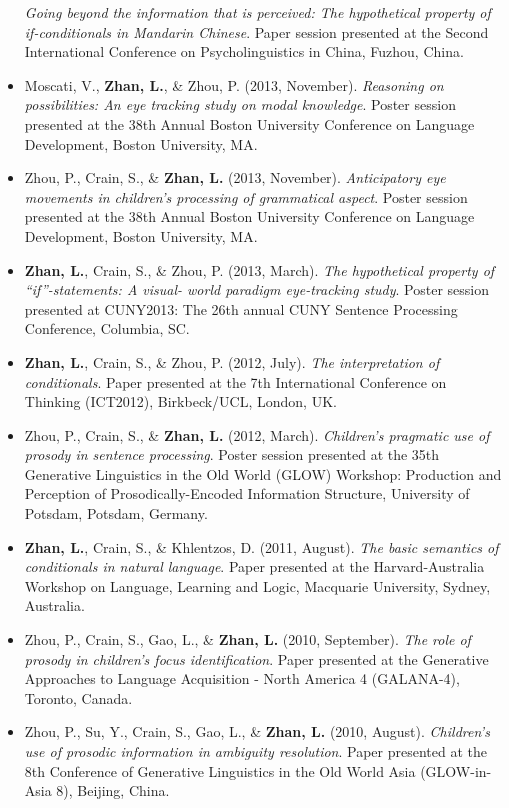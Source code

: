 \documentclass[10pt,]{article}
\begin{document}
\begin{itemize}
  \emph{Going beyond the information that is perceived: The hypothetical
  property of if-conditionals in Mandarin Chinese}. Paper session
  presented at the Second International Conference on Psycholinguistics
  in China, Fuzhou, China.
\item
  Moscati, V., \textbf{Zhan, L.}, \& Zhou, P. (2013, November).
  \emph{Reasoning on possibilities: An eye tracking study on modal
  knowledge}. Poster session presented at the 38th Annual Boston
  University Conference on Language Development, Boston University, MA.
\item
  Zhou, P., Crain, S., \& \textbf{Zhan, L.} (2013, November).
  \emph{Anticipatory eye movements in children's processing of
  grammatical aspect}. Poster session presented at the 38th Annual
  Boston University Conference on Language Development, Boston
  University, MA.
\item
  \textbf{Zhan, L.}, Crain, S., \& Zhou, P. (2013, March). \emph{The
  hypothetical property of ``if''-statements: A visual- world paradigm
  eye-tracking study}. Poster session presented at CUNY2013: The 26th
  annual CUNY Sentence Processing Conference, Columbia, SC.
\item
  \textbf{Zhan, L.}, Crain, S., \& Zhou, P. (2012, July). \emph{The
  interpretation of conditionals}. Paper presented at the 7th
  International Conference on Thinking (ICT2012), Birkbeck/UCL, London,
  UK.
\item
  Zhou, P., Crain, S., \& \textbf{Zhan, L.} (2012, March).
  \emph{Children's pragmatic use of prosody in sentence processing}.
  Poster session presented at the 35th Generative Linguistics in the Old
  World (GLOW) Workshop: Production and Perception of
  Prosodically-Encoded Information Structure, University of Potsdam,
  Potsdam, Germany.
\item
  \textbf{Zhan, L.}, Crain, S., \& Khlentzos, D. (2011, August).
  \emph{The basic semantics of conditionals in natural language}. Paper
  presented at the Harvard-Australia Workshop on Language, Learning and
  Logic, Macquarie University, Sydney, Australia.
\item
  Zhou, P., Crain, S., Gao, L., \& \textbf{Zhan, L.} (2010, September).
  \emph{The role of prosody in children's focus identification}. Paper
  presented at the Generative Approaches to Language Acquisition - North
  America 4 (GALANA-4), Toronto, Canada.
\item
  Zhou, P., Su, Y., Crain, S., Gao, L., \& \textbf{Zhan, L.} (2010,
  August). \emph{Children's use of prosodic information in ambiguity
  resolution}. Paper presented at the 8th Conference of Generative
  Linguistics in the Old World Asia (GLOW-in-Asia 8), Beijing, China.
\end{itemize}
\end{document}
